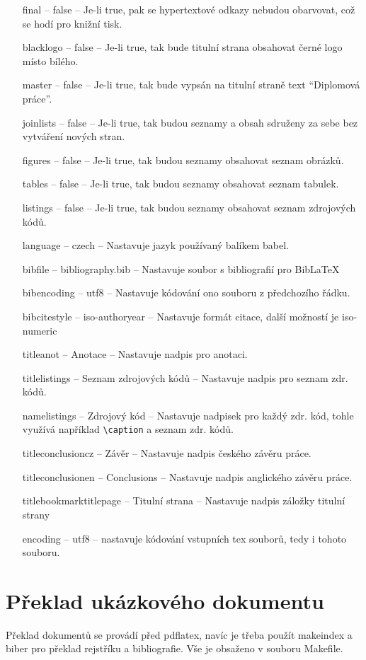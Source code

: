 \documentclass[a4paper,12pt]{article}
\begin{document}
\begin{itemize}
\item[final] -- false -- Je-li true, pak se hypertextové odkazy nebudou obarvovat, což se hodí pro knižní tisk. 
\item[blacklogo] -- false -- Je-li true, tak bude titulní strana obsahovat černé logo místo bílého. 
\item[master] -- false -- Je-li true, tak bude vypsán na titulní straně text \enquote{Diplomová práce}. 
\item[joinlists] -- false -- Je-li true, tak budou seznamy a obsah sdruženy za sebe bez vytváření nových stran. 
\item[figures] -- false -- Je-li true, tak budou seznamy obsahovat seznam obrázků. 
\item[tables] -- false -- Je-li true, tak budou seznamy obsahovat seznam tabulek.  
\item[listings] -- false -- Je-li true, tak budou seznamy obsahovat seznam zdrojových kódů.  
\item[language] -- czech -- Nastavuje jazyk používaný balíkem babel. 
\item[bibfile] -- bibliography.bib -- Nastavuje soubor s bibliografií pro Bib\LaTeX 
\item[bibencoding] -- utf8 -- Nastavuje kódování ono souboru z předchozího řádku. 
\item[bibcitestyle] -- iso-authoryear -- Nastavuje formát citace, další možností je iso-numeric 
\item[titleanot] -- Anotace -- Nastavuje nadpis pro anotaci. 
\item[titlelistings] -- Seznam zdrojových kódů -- Nastavuje nadpis pro seznam zdr. kódů. 
\item[namelistings] -- Zdrojový kód -- Nastavuje nadpisek pro každý zdr. kód, tohle využívá například \verb|\caption| a seznam zdr. kódů. 
\item[titleconclusioncz] -- Závěr -- Nastavuje nadpis českého závěru práce. 
\item[titleconclusionen] -- Conclusions -- Nastavuje nadpis anglického závěru práce. 
\item[titlebookmarktitlepage] -- Titulní strana -- Nastavuje nadpis záložky titulní strany 
\item[encoding] -- utf8 -- nastavuje kódování vstupních tex souborů, tedy i tohoto souboru. 
\end{itemize}

\section{Překlad ukázkového dokumentu}
Překlad dokumentů se provádí před pdflatex, navíc je třeba použít makeindex a biber pro překlad rejstříku a bibliografie. Vše je obsaženo v souboru Makefile.
\end{document}
